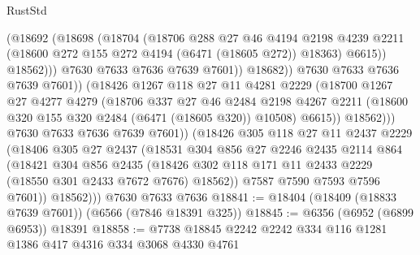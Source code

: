 \begin{lexlean}{RustStd}
\begin{coremodule}
                              (@18692
                                (@18698
                                  (@18704
                                    (@18706
                                      @288
                                      @27
                                      @46
                                      @4194
                                      @2198
                                      @4239
                                      @2211
                                      (@18600 @272 @155 @272 @4194 (@6471 (@18605 @272)) @18363)
                                      @6615))
                                  @18562)))
                            @7630
                            @7633
                            @7636
                            @7639
                            @7601))
                        @18682))
                    @7630
                    @7633
                    @7636
                    @7639
                    @7601))
                (@18426
                  @1267
                  @118
                  @27
                  @11
                  @4281
                  @2229
                  (@18700
                    @1267
                    @27
                    @4277
                    @4279
                    (@18706
                      @337
                      @27
                      @46
                      @2484
                      @2198
                      @4267
                      @2211
                      (@18600 @320 @155 @320 @2484 (@6471 (@18605 @320)) @10508)
                      @6615))
                  @18562)))
            @7630
            @7633
            @7636
            @7639
            @7601))
        (@18426
          @305
          @118
          @27
          @11
          @2437
          @2229
          (@18406
            @305
            @27
            @2437
            (@18531
              @304
              @856
              @27
              @2246
              @2435
              @2114
              @864
              (@18421
                @304
                @856
                @2435
                (@18426 @302 @118 @171 @11 @2433 @2229 (@18550 @301 @2433 @7672 @7676) @18562))
              @7587
              @7590
              @7593
              @7596
              @7601))
          @18562)))
    @7630
    @7633
    @7636
@18841 := @18404 (@18409 (@18833 @7639 @7601)) (@6566 (@7846 @18391 @325))
@18845 := @6356 (@6952 (@6899 @6953)) @18391
@18858 := @7738 @18845 @2242 @2242 @334 @116 @1281 @1386 @417 @4316 @334 @3068 @4330 @4761

\end{coremodule}
\end{lexlean}
